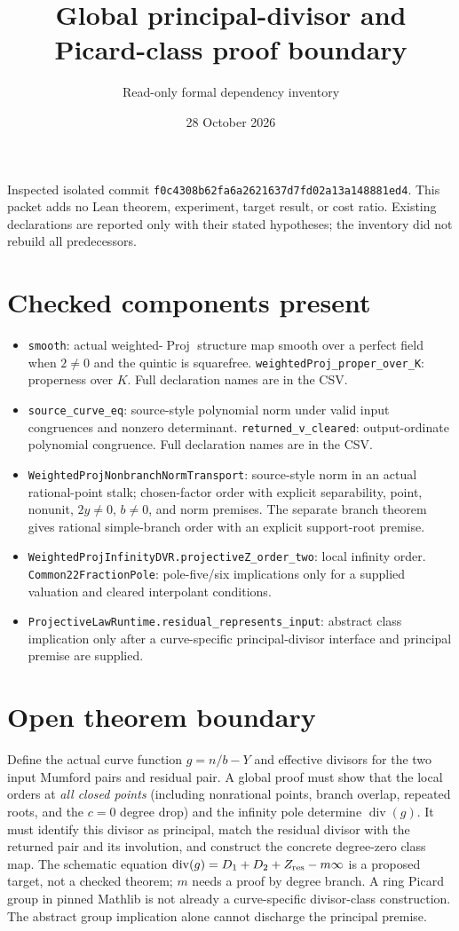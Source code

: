 \documentclass[10pt]{article}
\title{Global principal-divisor and Picard-class proof boundary}
\author{Read-only formal dependency inventory}
\date{28 October 2026}
\begin{document}
\maketitle
\noindent Inspected isolated commit \texttt{f0c4308b62fa6a2621637d7fd02a13a148881ed4}. This packet adds no Lean theorem, experiment, target result, or cost ratio. Existing declarations are reported only with their stated hypotheses; the inventory did not rebuild all predecessors.

\section*{Checked components present}
\begin{itemize}
\item \texttt{smooth}: actual weighted-$\operatorname{Proj}$ structure map smooth over a perfect field when $2\ne0$ and the quintic is squarefree. \texttt{weightedProj\_proper\_over\_K}: properness over $K$. Full declaration names are in the CSV.
\item \texttt{source\_curve\_eq}: source-style polynomial norm under valid input congruences and nonzero determinant. \texttt{returned\_v\_cleared}: output-ordinate polynomial congruence. Full declaration names are in the CSV.
\item \texttt{WeightedProjNonbranchNormTransport}: source-style norm in an actual rational-point stalk; chosen-factor order with explicit separability, point, nonunit, $2y\ne0$, $b\ne0$, and norm premises. The separate branch theorem gives rational simple-branch order with an explicit support-root premise.
\item \texttt{WeightedProjInfinityDVR.projectiveZ\_order\_two}: local infinity order. \texttt{Common22FractionPole}: pole-five/six implications only for a supplied valuation and cleared interpolant conditions.
\item \texttt{ProjectiveLawRuntime.residual\_represents\_input}: abstract class implication only after a curve-specific principal-divisor interface and principal premise are supplied.
\end{itemize}

\section*{Open theorem boundary}
Define the actual curve function $g=n/b-Y$ and effective divisors for the two input Mumford pairs and residual pair. A global proof must show that the local orders at \emph{all closed points} (including nonrational points, branch overlap, repeated roots, and the $c=0$ degree drop) and the infinity pole determine $\operatorname{div}(g)$. It must identify this divisor as principal, match the residual divisor with the returned pair and its involution, and construct the concrete degree-zero class map. The schematic equation $\operatorname{div}(g)=D_1+D_2+Z_{\rm res}-m\infty$ is a proposed target, not a checked theorem; $m$ needs a proof by degree branch. A ring Picard group in pinned Mathlib is not already a curve-specific divisor-class construction. The abstract group implication alone cannot discharge the principal premise.
\end{document}
